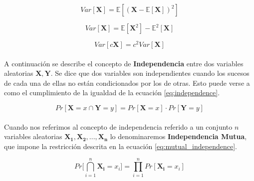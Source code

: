 \documentclass{subfiles}
\begin{document}
        \begin{equation}
        \label{eq:variance}
          Var[\boldsymbol{X}] = \mathbb{E}[(\boldsymbol{X} - \mathbb{E}[\boldsymbol{X}])^2]
        \end{equation}

        \begin{equation}
        \label{eq:variance_p1}
          Var[\boldsymbol{X}] = \mathbb{E}[\boldsymbol{X}^2] - \mathbb{E}^2[\boldsymbol{X}]
        \end{equation}

        \begin{equation}
        \label{eq:variance_p2}
          Var[c \boldsymbol{X}] = c^2 Var[\boldsymbol{X}]
        \end{equation}

        \paragraph{}
        A continuación se describe el concepto de \textbf{Independencia} entre dos variables aleatorias $\boldsymbol{X}, \boldsymbol{Y}$. Se dice que dos variables son independientes cuando los sucesos de cada una de ellas no están condicionados por los de otras. Esto puede verse a como el cumplimiento de la igualdad de la ecuación \eqref{eq:independence}.

        \begin{equation}
        \label{eq:independence}
          Pr[\boldsymbol{X} = x \cap \boldsymbol{Y} = y] = Pr[\boldsymbol{X} = x] \cdot Pr[\boldsymbol{Y} = y]
        \end{equation}

        \paragraph{}
        Cuando nos referimos al concepto de independencia referido a un conjunto $n$ variables aleatorias $\boldsymbol{X_1}, \boldsymbol{X_2},..., \boldsymbol{X_n}$ lo denominaremos \textbf{Independencia Mutua}, que impone la restricción descrita en la ecuación \eqref{eq:mutual_independence}.

        \begin{equation}
        \label{eq:mutual_independence}
          Pr \bigg[ \bigcap_{i=1}^n \boldsymbol{X_i} = x_i \bigg] = \prod_{i=1}^n Pr[\boldsymbol{X_i} = x_i]
        \end{equation}
\end{document}

